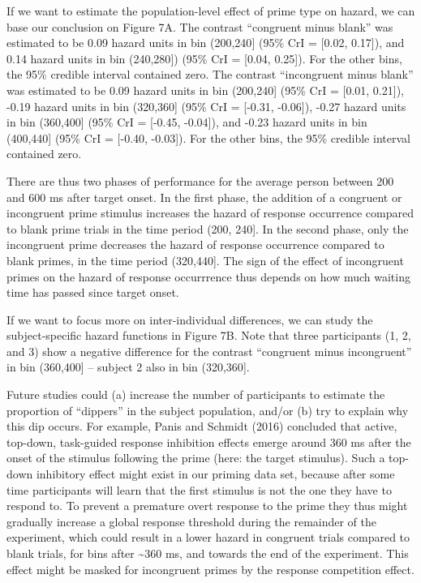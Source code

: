 \documentclass[
  man, donotrepeattitle,floatsintext]{apa6}
\begin{document}
If we want to estimate the population-level effect of prime type on hazard, we can base our conclusion on Figure 7A. The contrast ``congruent minus blank'' was estimated to be 0.09 hazard units in bin (200,240{]} (95\% CrI = {[}0.02, 0.17{]}), and 0.14 hazard units in bin (240,280{]}) (95\% CrI = {[}0.04, 0.25{]}). For the other bins, the 95\% credible interval contained zero.
The contrast ``incongruent minus blank'' was estimated to be 0.09 hazard units in bin (200,240{]} (95\% CrI = {[}0.01, 0.21{]}), -0.19 hazard units in bin (320,360{]} (95\% CrI = {[}-0.31, -0.06{]}), -0.27 hazard units in bin (360,400{]} (95\% CrI = {[}-0.45, -0.04{]}), and -0.23 hazard units in bin (400,440{]} (95\% CrI = {[}-0.40, -0.03{]}). For the other bins, the 95\% credible interval contained zero.

There are thus two phases of performance for the average person between 200 and 600 ms after target onset. In the first phase, the addition of a congruent or incongruent prime stimulus increases the hazard of response occurrence compared to blank prime trials in the time period (200, 240{]}. In the second phase, only the incongruent prime decreases the hazard of response occurrence compared to blank primes, in the time period (320,440{]}. The sign of the effect of incongruent primes on the hazard of response occurrrence thus depends on how much waiting time has passed since target onset.

If we want to focus more on inter-individual differences, we can study the subject-specific hazard functions in Figure 7B. Note that three participants (1, 2, and 3) show a negative difference for the contrast ``congruent minus incongruent'' in bin (360,400{]} -- subject 2 also in bin (320,360{]}.

Future studies could (a) increase the number of participants to estimate the proportion of ``dippers'' in the subject population, and/or (b) try to explain why this dip occurs. For example, Panis and Schmidt (2016) concluded that active, top-down, task-guided response inhibition effects emerge around 360 ms after the onset of the stimulus following the prime (here: the target stimulus). Such a top-down inhibitory effect might exist in our priming data set, because after some time participants will learn that the first stimulus is not the one they have to respond to. To prevent a premature overt response to the prime they thus might gradually increase a global response threshold during the remainder of the experiment, which could result in a lower hazard in congruent trials compared to blank trials, for bins after \textasciitilde360 ms, and towards the end of the experiment. This effect might be masked for incongruent primes by the response competition effect.
\end{document}
